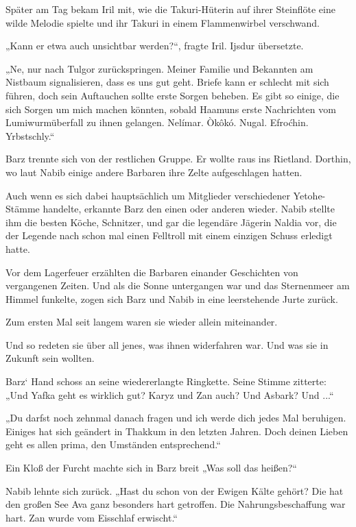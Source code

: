Später am Tag bekam Iril mit, wie die Takuri-Hüterin auf ihrer Steinflöte eine wilde Melodie spielte und ihr Takuri in einem Flammenwirbel verschwand.

„Kann er etwa auch unsichtbar werden?“, fragte Iril. Ijsdur übersetzte.

„Ne, nur nach Tulgor zurückspringen. Meiner Familie und Bekannten am Nistbaum signalisieren, dass es uns gut geht. Briefe kann er schlecht mit sich führen, doch sein Auftauchen sollte erste Sorgen beheben. Es gibt so einige, die sich Sorgen um mich machen könnten, sobald Haamuns erste Nachrichten vom Lumiwurmüberfall zu ihnen gelangen. Nelímar. Òkôkó. Nugal. Efroćhin. Yrbstschly.“

Barz trennte sich von der restlichen Gruppe. Er wollte raus ins Rietland. Dorthin, wo laut Nabib einige andere Barbaren ihre Zelte aufgeschlagen hatten.

Auch wenn es sich dabei hauptsächlich um Mitglieder verschiedener Yetohe-Stämme handelte, erkannte Barz den einen oder anderen wieder. Nabib stellte ihm die besten Köche, Schnitzer, und gar die legendäre Jägerin Naldia vor, die der Legende nach schon mal einen Felltroll mit einem einzigen Schuss erledigt hatte.

Vor dem Lagerfeuer erzählten die Barbaren einander Geschichten von vergangenen Zeiten. Und als die Sonne untergangen war und das Sternenmeer am Himmel funkelte, zogen sich Barz und Nabib in eine leerstehende Jurte zurück.

Zum ersten Mal seit langem waren sie wieder allein miteinander.

Und so redeten sie über all jenes, was ihnen widerfahren war. Und was sie in Zukunft sein wollten.\bigskip







Barz‘ Hand schoss an seine wiedererlangte Ringkette. Seine Stimme zitterte: „Und Yafka geht es wirklich gut? Karyz und Zan auch? Und Asbark? Und ...“

„Du darfst noch zehnmal danach fragen und ich werde dich jedes Mal beruhigen. Einiges hat sich geändert in Thakkum in den letzten Jahren. Doch deinen Lieben geht es allen prima, den Umständen entsprechend.“

Ein Kloß der Furcht machte sich in Barz breit „Was soll das heißen?“

Nabib lehnte sich zurück. „Hast du schon von der Ewigen Kälte gehört? Die hat den großen See Ava ganz besonders hart getroffen. Die Nahrungsbeschaffung war hart. Zan wurde vom Eisschlaf erwischt.“


